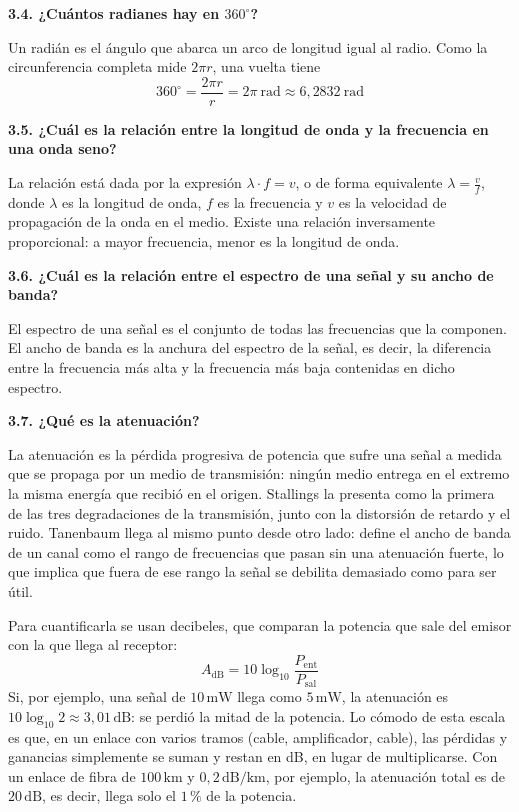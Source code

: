\documentclass[11pt,a4paper]{article}
\begin{document}
\vspace{0.3cm}
\noindent\textbf{3.4. ¿Cuántos radianes hay en $360^\circ$?}\par
Un radián es el ángulo que abarca un arco de longitud igual al radio. Como la circunferencia completa mide $2\pi r$, una vuelta tiene
\[
  360^\circ = \frac{2\pi r}{r} = 2\pi~\text{rad} \approx 6{,}2832~\text{rad}
\]

\vspace{0.3cm}
\noindent\textbf{3.5. ¿Cuál es la relación entre la longitud de onda y la frecuencia en una onda seno?}\par
La relación está dada por la expresión $\lambda \cdot f = v$, o de forma equivalente $\lambda = \frac{v}{f}$, donde $\lambda$ es la longitud de onda, $f$ es la frecuencia y $v$ es la velocidad de propagación de la onda en el medio. Existe una relación inversamente proporcional: a mayor frecuencia, menor es la longitud de onda.

\vspace{0.3cm}
\noindent\textbf{3.6. ¿Cuál es la relación entre el espectro de una señal y su ancho de banda?}\par
El espectro de una señal es el conjunto de todas las frecuencias que la componen. El ancho de banda es la anchura del espectro de la señal, es decir, la diferencia entre la frecuencia más alta y la frecuencia más baja contenidas en dicho espectro.

\vspace{0.3cm}
\noindent\textbf{3.7. ¿Qué es la atenuación?}\par
La atenuación es la pérdida progresiva de potencia que sufre una señal a medida que se propaga por un medio de transmisión: ningún medio entrega en el extremo la misma energía que recibió en el origen. Stallings la presenta como la primera de las tres degradaciones de la transmisión, junto con la distorsión de retardo y el ruido. Tanenbaum llega al mismo punto desde otro lado: define el ancho de banda de un canal como el rango de frecuencias que pasan sin una atenuación fuerte, lo que implica que fuera de ese rango la señal se debilita demasiado como para ser útil.

Para cuantificarla se usan decibeles, que comparan la potencia que sale del emisor con la que llega al receptor:
\[
  A_{\mathrm{dB}} = 10\log_{10}\frac{P_{\mathrm{ent}}}{P_{\mathrm{sal}}}
\]
Si, por ejemplo, una señal de $10\,\mathrm{mW}$ llega como $5\,\mathrm{mW}$, la atenuación es $10\log_{10}2\approx3{,}01\,\mathrm{dB}$: se perdió la mitad de la potencia. Lo cómodo de esta escala es que, en un enlace con varios tramos (cable, amplificador, cable), las pérdidas y ganancias simplemente se suman y restan en dB, en lugar de multiplicarse. Con un enlace de fibra de $100\,\mathrm{km}$ y $0{,}2\,\mathrm{dB/km}$, por ejemplo, la atenuación total es de $20\,\mathrm{dB}$, es decir, llega solo el $1\,\%$ de la potencia.
\end{document}
